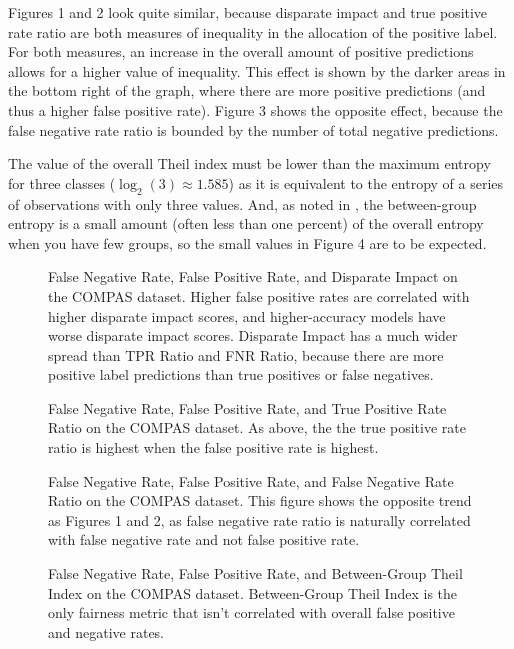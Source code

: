 \documentclass{elsarticle}
\newcommand{\figures}[4]{
	\begin{figure}[H]{
		\centering{
			\texttt{[image: \#1]}
		}
		\caption{#2}
		}
	\end{figure}
	\begin{figure}[H] {
		\centering{
			\texttt{[image: \#3]}
		}
		\caption{#4}
	}
	\end{figure}
}
\begin{document}
Figures 1 and 2 look quite similar, because disparate impact and true positive rate ratio are both measures of inequality in the allocation of the positive label. For both measures, an increase in the overall amount of positive predictions allows for a higher value of inequality. This effect is shown by the darker areas in the bottom right of the graph, where there are more positive predictions (and thus a higher false positive rate). Figure 3 shows the opposite effect, because the false negative rate ratio is bounded by the number of total negative predictions.

The value of the overall Theil index must be lower than the maximum entropy for three classes ($\log_2(3) \approx 1.585$) as it is equivalent to the entropy of a series of observations with only three values. And, as noted in \citep{Speicher:2018}, the between-group entropy is a small amount (often less than one percent) of the overall entropy when you have few groups, so the small values in Figure 4 are to be expected.

\figures{Disparate Impact|COMPAS.png}{False Negative Rate, False Positive Rate, and Disparate Impact on the COMPAS dataset. Higher false positive rates are correlated with higher disparate impact scores, and higher-accuracy models have worse disparate impact scores. Disparate Impact has a much wider spread than TPR Ratio and FNR Ratio, because there are more positive label predictions than true positives or false negatives.}{TPR Ratio|COMPAS.png}{False Negative Rate, False Positive Rate, and True Positive Rate Ratio on the COMPAS dataset. As above, the the true positive rate ratio is highest when the false positive rate is highest.}

\figures{FNR Ratio|COMPAS.png}{False Negative Rate, False Positive Rate, and False Negative Rate Ratio on the COMPAS dataset. This figure shows the opposite trend as Figures 1 and 2, as false negative rate ratio is naturally correlated with false negative rate and not false positive rate.}{Between-Group Theil Index|COMPAS.png}{False Negative Rate, False Positive Rate, and Between-Group Theil Index on the COMPAS dataset. Between-Group Theil Index is the only fairness metric that isn't correlated with overall false positive and negative rates.}
\end{document}
